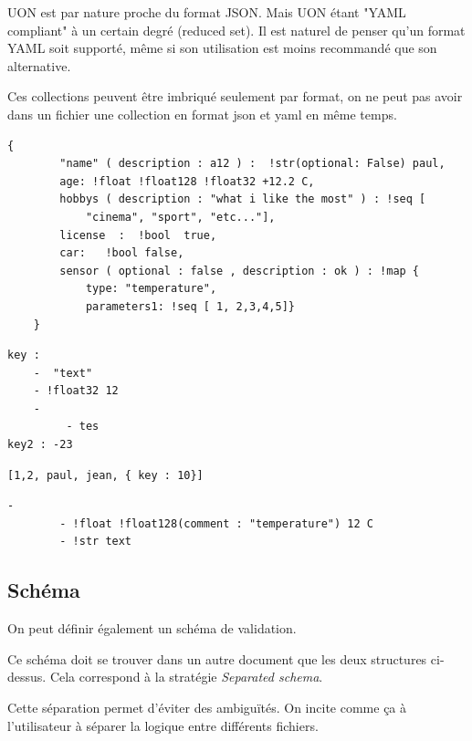 \documentclass[
    iict, %
    il, %
]{heig-tb}
\begin{document}
UON est par nature proche du format JSON. Mais UON étant "YAML compliant" à un certain degré (reduced set). Il est naturel de penser qu'un format YAML soit supporté, même si son utilisation est moins recommandé que son alternative.

Ces collections peuvent être imbriqué seulement par format, on ne peut pas avoir dans un fichier une collection en format json et yaml en même temps.

\begin{lstlisting}[frame=single,caption={Exemple d'un mapping en format JSON},captionpos=b,label={json-map}]
    {
        "name" ( description : a12 ) :  !str(optional: False) paul,
        age: !float !float128 !float32 +12.2 C,
        hobbys ( description : "what i like the most" ) : !seq [
            "cinema", "sport", "etc..."],
        license  :  !bool  true,
        car:   !bool false,
        sensor ( optional : false , description : ok ) : !map {
            type: "temperature",
            parameters1: !seq [ 1, 2,3,4,5]}
    }
\end{lstlisting}

\begin{lstlisting}[frame=single,caption={Exemple d'un mapping en format YAML},captionpos=b,label={yaml-map}]
key :
    -  "text"
    - !float32 12
    -
         - tes
key2 : -23
\end{lstlisting}

\begin{lstlisting}[frame=single,caption={Exemple d'une séquence en format JSON},captionpos=b,label={json-seq}]
[1,2, paul, jean, { key : 10}]
\end{lstlisting}

\begin{lstlisting}[frame=single,caption={Exemple d'une séquence en format YAML},captionpos=b,label={yaml-seq}]
    -
        - !float !float128(comment : "temperature") 12 C
        - !str text
\end{lstlisting}

\subsection{Schéma}
On peut définir également un schéma de validation.

Ce schéma doit se trouver dans un autre document que les deux structures ci-dessus. Cela correspond à la stratégie \emph{Separated schema}.

Cette séparation permet d'éviter des ambiguïtés. On incite comme ça à l'utilisateur à séparer la logique entre différents fichiers.
\end{document}
